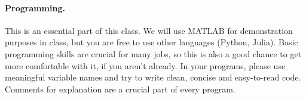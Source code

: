 \documentclass[11pt]{article}
\begin{document}
{{    \paragraph{Programming.}
    This is an essential part of this class. We will use MATLAB for
    demonstration purposes in class, but you are free to use other
    languages (Python, Julia). Basic programming skills are crucial
    for many jobs, so this is also a good chance to get more
    comfortable with it, if you aren't already.  In your programs,
    please use meaningful variable names and try to write clean, concise
    and easy-to-read code. Comments for explanation are a crucial part
    of every program. }%
  \hspace{3ex}
}

\end{document}
